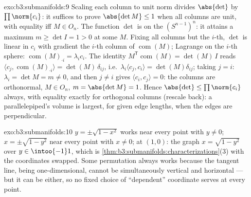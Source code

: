 \begin{solution}{exo:b3:submanifolds:9}
Scaling each column to unit norm divides $\abs{\det}$ by
$\prod\norm{c_i}$: it suffices to prove $\abs{\det M} \leq 1$
when all columns are unit, with equality iff $M \in O_n$. The
function $\det$ is  on the 
$(S^{n-1})^n$: it attains a maximum $m \geq \det I = 1 > 0$
at some $M$. Fixing all columns but the $i$-th, $\det$ is
linear in $c_i$ with gradient the $i$-th column of
$\operatorname{com}(M)$; Lagrange on the $i$-th sphere:
$\operatorname{com}(M)_{\cdot i} = \lambda_i c_i$. The
identity $M^{\mathsf T}\operatorname{com}(M) = \det(M)\,I$
reads $\langle c_j, \operatorname{com}(M)_{\cdot i}\rangle =
\det(M)\,\delta_{ij}$, i.e.\ $\lambda_i\langle c_j,
c_i\rangle = \det(M)\delta_{ij}$; taking $j = i$: $\lambda_i
= \det M = m \neq 0$, and then $j \neq i$ gives $\langle c_i,
c_j\rangle = 0$: the columns are orthonormal, $M \in O_n$,
$m = \abs{\det M} = 1$. Hence $\abs{\det} \leq
\prod\norm{c_i}$ always, with equality exactly for orthogonal
columns (rescale back): a parallelepiped's volume is largest,
for given edge lengths, when the edges are perpendicular.
\end{solution}

\begin{solution}{exo:b3:submanifolds:10}
$y = \pm\sqrt{1 - x^2}$ works near every point with $y \neq
0$; $x = \pm\sqrt{1 - y^2}$ near every point with $x \neq 0$;
at $(1, 0)$: the graph $x = \sqrt{1 - y^2}$ over $y \in
\intoo{-1}1$, which is
\cref{thm:b3:submanifolds:characterizations}(3) with the
coordinates swapped. Some permutation always works because
the tangent line, being one-dimensional, cannot be
simultaneously vertical and horizontal --- but it can be
either, so no fixed choice of ``dependent'' coordinate
serves at every point.
\end{solution}

